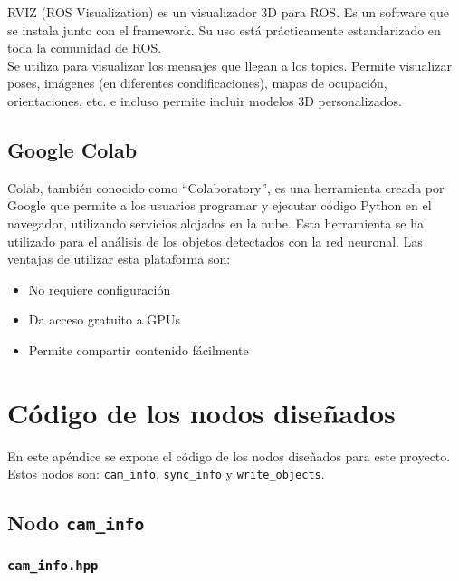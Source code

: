 RVIZ (ROS Visualization) es un visualizador 3D para ROS. Es un software que se instala junto con el framework. Su uso está prácticamente estandarizado en toda la comunidad de ROS.\\

Se utiliza para visualizar los mensajes que llegan a los topics. Permite visualizar poses, imágenes (en diferentes condificaciones),  mapas de ocupación, orientaciones, etc. e incluso permite incluir modelos 3D personalizados.\\

\section{Google Colab}

Colab, también conocido como ``Colaboratory'', es una herramienta creada por Google que permite a los usuarios programar y ejecutar código Python en el navegador, utilizando servicios alojados en la nube. Esta herramienta se ha utilizado para el análisis de los objetos detectados con la red neuronal. Las ventajas de utilizar esta plataforma son:

\begin{itemize}

	\item No requiere configuración
	\item Da acceso gratuito a GPUs
	\item Permite compartir contenido fácilmente

\end{itemize}


\chapter{Código de los nodos diseñados}

En este apéndice se expone el código de los nodos diseñados para este proyecto. Estos nodos son: \texttt{cam\_info}, \texttt{sync\_info} y \texttt{write\_objects}.\\

\section{Nodo \texttt{cam\_info}}

\subsection*{\texttt{cam\_info.hpp}}

